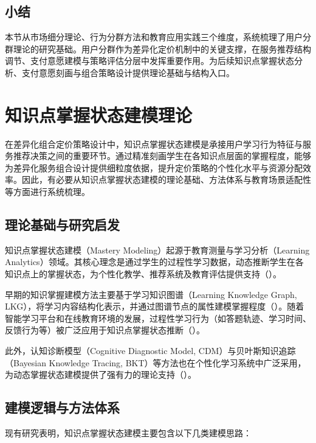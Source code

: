 \subsection*{小结}

本节从市场细分理论、行为分群方法和教育应用实践三个维度，系统梳理了用户分群理论的研究基础。用户分群作为差异化定价机制中的关键支撑，在服务推荐结构调节、支付意愿建模与策略评估分层中发挥重要作用。为后续知识点掌握状态分析、支付意愿刻画与组合策略设计提供理论基础与结构入口。

\section{知识点掌握状态建模理论}
\label{sec:知识点掌握状态建模理论}

在差异化组合定价策略设计中，知识点掌握状态建模是承接用户学习行为特征与服务推荐决策之间的重要环节。通过精准刻画学生在各知识点层面的掌握程度，能够为差异化服务组合设计提供细粒度依据，提升定价策略的个性化水平与资源分配效率。因此，有必要从知识点掌握状态建模的理论基础、方法体系与教育场景适配性等方面进行系统梳理。

\subsection{理论基础与研究启发}

知识点掌握状态建模（Mastery Modeling）起源于教育测量与学习分析（Learning Analytics）领域。其核心理念是通过学生的过程性学习数据，动态推断学生在各知识点上的掌握状态，为个性化教学、推荐系统及教育评估提供支持（\cite{siemens2011openlearning,chen2020adaptivepath}）。

早期的知识掌握建模方法主要基于学习知识图谱（Learning Knowledge Graph, LKG），将学习内容结构化表示，并通过图谱节点的属性建模掌握程度（\cite{chen2020adaptivepath}）。随着智能学习平台和在线教育环境的发展，过程性学习行为（如答题轨迹、学习时间、反馈行为等）被广泛应用于知识点掌握状态推断（\cite{sun2021moocpricing}）。

此外，认知诊断模型（Cognitive Diagnostic Model, CDM）与贝叶斯知识追踪（Bayesian Knowledge Tracing, BKT）等方法也在个性化学习系统中广泛采用，为动态掌握状态建模提供了强有力的理论支持（\cite{delatorre_minchen_2014,corbett_anderson_1995}）。

\subsection{建模逻辑与方法体系}

现有研究表明，知识点掌握状态建模主要包含以下几类建模思路：

